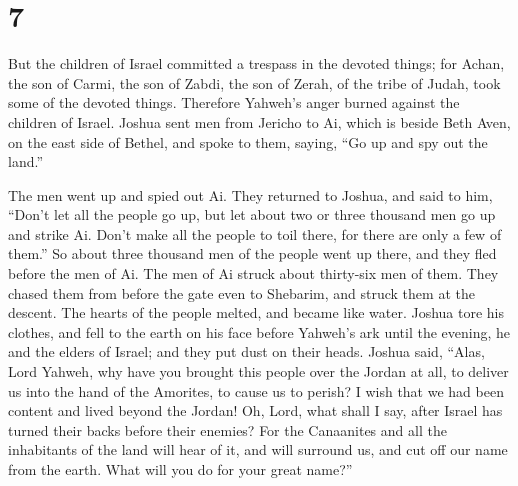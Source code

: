 \hypertarget{section-6}{%
\section{7}\label{section-6}}

 But the children of Israel committed a trespass in the
devoted things; for Achan, the son of Carmi, the son of Zabdi, the son
of Zerah, of the tribe of Judah, took some of the devoted things.
Therefore Yahweh's anger burned against the children of Israel.
 Joshua sent men from Jericho to Ai, which is beside Beth
Aven, on the east side of Bethel, and spoke to them, saying, ``Go up and
spy out the land.''

The men went up and spied out Ai.  They returned to
Joshua, and said to him, ``Don't let all the people go up, but let about
two or three thousand men go up and strike Ai. Don't make all the people
to toil there, for there are only a few of them.''  So
about three thousand men of the people went up there, and they fled
before the men of Ai.  The men of Ai struck about
thirty-six men of them. They chased them from before the gate even to
Shebarim, and struck them at the descent. The hearts of the people
melted, and became like water.  Joshua tore his clothes,
and fell to the earth on his face before Yahweh's ark until the evening,
he and the elders of Israel; and they put dust on their heads.
 Joshua said, ``Alas, Lord Yahweh, why have you brought
this people over the Jordan at all, to deliver us into the hand of the
Amorites, to cause us to perish? I wish that we had been content and
lived beyond the Jordan!  Oh, Lord, what shall I say,
after Israel has turned their backs before their enemies? 
For the Canaanites and all the inhabitants of the land will hear of it,
and will surround us, and cut off our name from the earth. What will you
do for your great name?''

